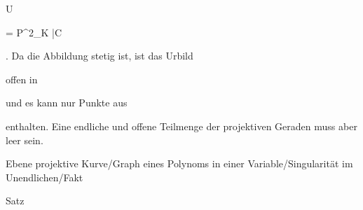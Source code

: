{\mavergleichskette

{\vergleichskette

{ U
}

{ = }{ {\mathbb P}^{2}_{K} \setminus \bar{C}
}

{  }{
}

{    }{
}

{   }{
}

}
{}{}{.}
Da die Abbildung stetig ist, ist das Urbild

 offen in

 und es kann nur Punkte aus

 enthalten. Eine endliche und offene Teilmenge der projektiven Geraden muss aber leer sein.


}



{Ebene projektive Kurve/Graph eines Polynoms in einer Variable/Singularität im Unendlichen/Fakt}

{Satz}

{}

